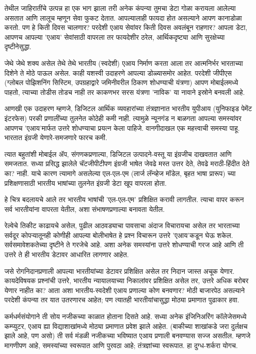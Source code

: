 तेथील जाहिरातींचे उत्पन्न हा एक भाग झाला तरी अनेक कंपन्या तुमचा डेटा गोळा करायला आलेल्या असतात आणि लालूच म्हणून सेवा फुकट देतात. आपल्यालाही फायदा होत असल्याने आपण कानाडोळा करतो. पण हे किती दिवस चालणार? परदेशी एआय सेवांवर किती दिवस अवलंबून राहणार? आपला डेटा, आपणच आपल्या 'एआय' सेवांसाठी वापरला तर फायदेशीर ठरेल, आर्थिकदृष्ट्या आणि सुरक्षेच्या दृष्टीनेसुद्धा.

जेथे जेथे शक्य असेल तेथे तेथे भारतीय (स्वदेशी) एआय निर्माण करता आला तर आत्मनिर्भर भारताच्या दिशेने ते मोठे पाऊल असेल. काही यशस्वी उदाहरणे आपल्या डोळ्यासमोर आहेत. परदेशी जीपीएस (ग्लोबल पोझिशनिंग सिस्टिम, उपग्रहाद्वारे जमिनीवरील ठिकाण शोधण्याची यंत्रणा) आपण मोबाईलमध्ये पाहतो, त्याच्या तोडीस तोडच नाही तर काकणभर सरस यंत्रणा 'नाविक' या नावाने इस्रोने बनवली आहे.

आणखी एक उदाहरण म्हणजे, डिजिटल आर्थिक व्यवहारांच्या तंत्रज्ञानात भारतीय युपीआय (युनिफाइड पेमेंट इंटरफेस) परकी प्रणालींच्या तुलनेत कोठेही कमी नाही. त्यामुळे न्यूनगंड न बाळगता आपल्या समस्यांवर आपणच 'एआय'मार्फत उत्तरे शोधण्याचा प्रयत्न केला पाहिजे. वानगीदाखल एक महत्त्वाची समस्या पाहू. भारतात इंग्रजी येणारे-समजणारे फारच कमी.

त्यात बहुतांशी मोबाईल ॲप, संगणकप्रणाल्या, डिजिटल उत्पादने-वस्तू या इंग्रजीच दाखवतात आणि समजतात. सध्या प्रसिद्ध झालेले चॅटजीपीटीपण इंग्रजी भाषेत जेवढे मस्त उत्तर देते, तेवढे मराठी-हिंदीत देते का? नाही. याचे कारण त्यामागे असलेल्या एल-एल-एम (लार्ज लॅन्व्हेज मॉडेल, बृहत भाषा प्रारूप) च्या प्रशिक्षणासाठी भारतीय भाषांच्या तुलनेत इंग्रजी डेटा खूप वापरला होता.

हे चित्र बदलायचे आले तर भारतीय भाषांची 'एल-एल-एम' प्रशिक्षित करावी लागतील. त्याचा वापर करून सर्व भारतीयांना वापरता येतील, अशा संभाषणप्रणाल्या बनावता येतील.

रेल्वेचे तिकीट काढायचे असेल, पुढील आठवड्याचा पावसाचा अंदाज विचारायचा असेल तर भारताच्या सर्वदूर कोपऱ्यातूनही कोणीही आपल्या बोलीभाषेत हे प्रश्न विचारून उत्तरे 'एआय'कडून घेऊ शकेल. सर्वसमावेशकतेच्या दृष्टीने ते गरजेचे आहे. अशा अनेक समस्यांना उत्तरे शोधण्याची गरज आहे आणि ती उत्तरे ते ही भारतीय डेटावर आधारित लागणार आहेत.

जसे रोगनिदानप्रणाली आपल्या भारतीयांच्या डेटावर प्रशिक्षित असेल तर निदान जास्त अचूक येणार. कायदेविषयक प्रश्नांची उत्तरे, भारतीय न्यायालयाच्या निकालांवर प्रशिक्षित असेल तर, उत्तरे अधिक बरोबर येणार नाहीत का? आता अशा भारतीय-स्वदेशी एआय प्रणाल्या कोण बनवणार? मोठी बाजारपेठ असल्याने परदेशी कंपन्या तर यात उतरणारच आहेत; पण त्यातही भारतीयांचासुद्धा मोठ्या प्रमाणात पुढाकार हवा.

कर्मधर्मसंयोगाने ती सोय नजीकच्या काळात होताना दिसते आहे. सध्या अनेक इंजिनिअरिंग कॉलेजेसमध्ये कम्प्युटर, एआय ह्या विद्याशाखांमध्ये मोठ्या प्रमाणात प्रवेश झाले आहेत. (बाकीच्या शाखांकडे जरा दुर्लक्षच झाले आहे, पण असो) ती सर्व मंडळी नजीकच्या भविष्यात एआय प्रणाली बनवण्यास सज्ज असतील. म्हणजे मागणीपण आहे, समस्यांच्या स्वरूपात आणि पुरवठा आहे; तंत्रज्ञांच्या स्वरूपात. हा दुग्ध-शर्करा योगच.

